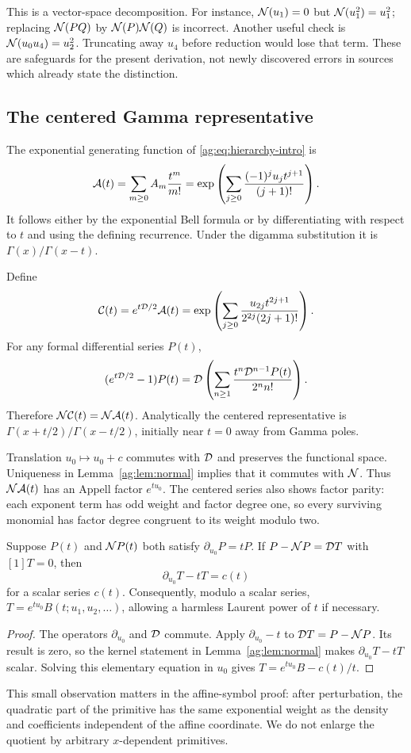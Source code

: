 This is a vector-space decomposition. For instance,
$\mathcal N(u_1)=0$ but $\mathcal N(u_1^2)=u_1^2$; replacing $\mathcal N(PQ)$ by
$\mathcal N(P)\mathcal N(Q)$ is incorrect. Another useful check is
$\mathcal N(u_0u_4)=u_2^2$. Truncating away $u_4$ before reduction would
lose that term. These are safeguards for the present derivation, not
newly discovered errors in sources which already state the distinction.

\subsection{The centered Gamma representative}
The exponential generating function of \eqref{ag:eq:hierarchy-intro} is
\begin{equation}\label{ag:eq:Bell}
 \mathcal A(t)=\sum_{m\ge0}A_m\frac{t^m}{m!}
 =\exp\left(\sum_{j\ge0}\frac{(-1)^j u_jt^{j+1}}{(j+1)!}\right).
\end{equation}
It follows either by the exponential Bell formula or by differentiating
with respect to $t$ and using the defining recurrence. Under the digamma
substitution it is $\Gamma(x)/\Gamma(x-t)$.

Define
\begin{equation}\label{ag:eq:centered}
 \mathcal C(t)=e^{t\mathcal D/2}\mathcal A(t)
 =\exp\left(\sum_{j\ge0}
       \frac{u_{2j}t^{2j+1}}{2^{2j}(2j+1)!}\right).
\end{equation}
For any formal differential series $P(t)$,
\[
 (e^{t\mathcal D/2}-1)P(t)
 =\mathcal D\left(\sum_{n\ge1}\frac{t^n\mathcal D^{n-1}P(t)}{2^n n!}\right).
\]
Therefore $\mathcal N\mathcal C(t)=\mathcal N\mathcal A(t)$. Analytically the centered
representative is $\Gamma(x+t/2)/\Gamma(x-t/2)$, initially near $t=0$
away from Gamma poles.

Translation $u_0\mapsto u_0+c$ commutes with $\mathcal D$ and preserves the
functional space. Uniqueness in Lemma~\ref{ag:lem:normal} implies that
it commutes with $\mathcal N$. Thus $\mathcal N\mathcal A(t)$ has an Appell factor $e^{tu_0}$.
The centered series also shows factor parity: each exponent term has
odd weight and factor degree one, so every surviving monomial has
factor degree congruent to its weight modulo two.

\begin{lemma}\label{ag:lem:appell-primitive}
Suppose $P(t)$ and $\mathcal N P(t)$ both satisfy
$\partial_{u_0}P=tP$. If $P-\mathcal N P=\mathcal D T$ with $[1]T=0$, then
\[
 \partial_{u_0}T-tT=c(t)
\]
for a scalar series $c(t)$. Consequently, modulo a scalar series,
$T=e^{tu_0}B(t;u_1,u_2,\ldots)$, allowing a harmless Laurent power
of $t$ if necessary.
\end{lemma}
\begin{proof}
The operators $\partial_{u_0}$ and $\mathcal D$ commute. Apply
$\partial_{u_0}-t$ to $\mathcal D T=P-\mathcal N P$. Its result is zero, so the
kernel statement in Lemma~\ref{ag:lem:normal} makes
$\partial_{u_0}T-tT$ scalar. Solving this elementary equation in $u_0$
gives $T=e^{tu_0}B-c(t)/t$.
\end{proof}
This small observation matters in the affine-symbol proof: after
perturbation, the quadratic part of the primitive has the same
exponential weight as the density and coefficients independent of the
affine coordinate. We do not enlarge the quotient by arbitrary
$x$-dependent primitives.

